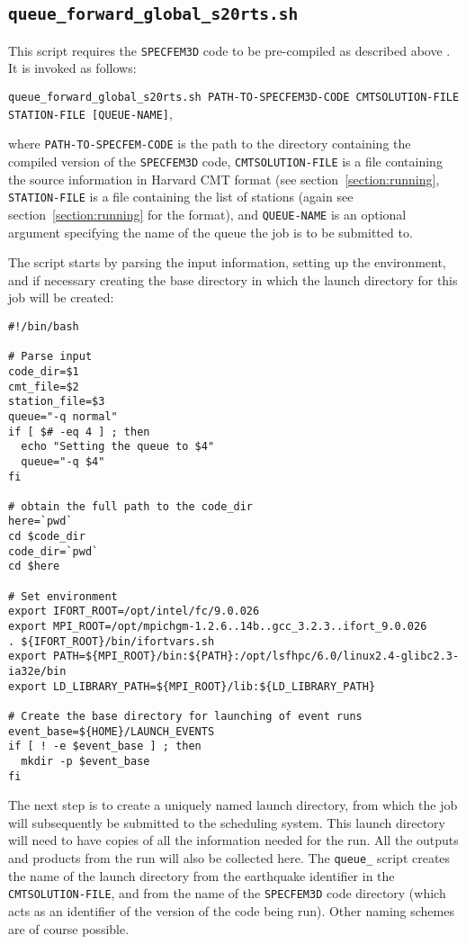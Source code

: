 \documentclass[onecolumn]{article}
\begin{document}
\subsection{\texttt{queue\_forward\_global\_s20rts.sh}}
This script requires the \texttt{SPECFEM3D} code to be pre-compiled as
described above . It is invoked as follows:

\texttt{queue\_forward\_global\_s20rts.sh PATH-TO-SPECFEM3D-CODE
CMTSOLUTION-FILE STATION-FILE [QUEUE-NAME]},

where \texttt{PATH-TO-SPECFEM-CODE} is the path to the directory containing the
compiled version of the \texttt{SPECFEM3D} code,
\texttt{CMTSOLUTION-FILE} is a file containing the source information in
Harvard CMT format (see section~\ref{section:running}, \texttt{STATION-FILE}
is a file containing the list of stations (again see section~\ref{section:running}
for the format), and  \texttt{QUEUE-NAME} is an optional argument specifying
the name of the queue the job is to be submitted to.  

The script starts by parsing the input information, setting up the environment,
and if necessary creating the base directory in which the launch directory
for this job will be created:

{\small
\begin{verbatim}
#!/bin/bash

# Parse input
code_dir=$1
cmt_file=$2
station_file=$3
queue="-q normal"
if [ $# -eq 4 ] ; then
  echo "Setting the queue to $4"
  queue="-q $4"
fi

# obtain the full path to the code_dir
here=`pwd`
cd $code_dir
code_dir=`pwd`
cd $here

# Set environment
export IFORT_ROOT=/opt/intel/fc/9.0.026
export MPI_ROOT=/opt/mpichgm-1.2.6..14b..gcc_3.2.3..ifort_9.0.026
. ${IFORT_ROOT}/bin/ifortvars.sh
export PATH=${MPI_ROOT}/bin:${PATH}:/opt/lsfhpc/6.0/linux2.4-glibc2.3-ia32e/bin
export LD_LIBRARY_PATH=${MPI_ROOT}/lib:${LD_LIBRARY_PATH}

# Create the base directory for launching of event runs
event_base=${HOME}/LAUNCH_EVENTS
if [ ! -e $event_base ] ; then
  mkdir -p $event_base
fi

\end{verbatim}}

The next step is to create a uniquely named launch directory, from which the
job will subsequently be submitted to the scheduling system.
This launch directory will need to have copies of all the information needed
for the run.
All the outputs and products from the run will also be collected here.
The \texttt{queue\_} script creates the name of the launch directory from
the earthquake identifier in the \texttt{CMTSOLUTION-FILE},
and from the name of the \texttt{SPECFEM3D} code directory
(which acts as an identifier of the version of the code being run).
Other naming schemes are of course possible.
\end{document}
